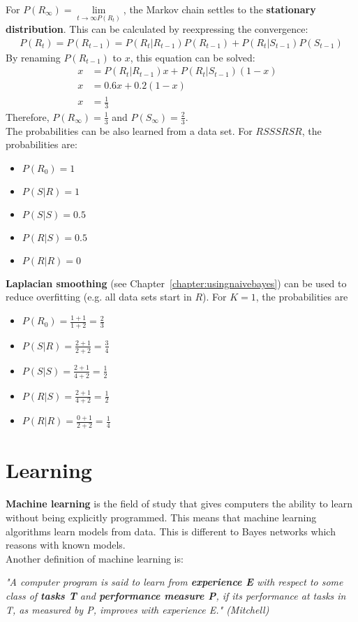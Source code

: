 \documentclass{report}
\begin{document}
For $P(R_\infty)=\lim\limits_{t \rightarrow \infty P(R_t)}$, the Markov chain settles to the {\bf stationary distribution}. This can be calculated by reexpressing the convergence:
\begin{align*}
P(R_t) = P(R_{t-1}) = P(R_t\vert R_{t-1})P(R_{t-1}) + P(R_t\vert S_{t-1})P(S_{t-1})
\end{align*}
By renaming $P(R_{t-1})$ to $x$, this equation can be solved:
\begin{align*}
x &= P(R_t\vert R_{t-1})x + P(R_t\vert S_{t-1})(1-x) &\\
x &= 0.6x + 0.2(1-x) \\
x &= \frac{1}{3}
\end{align*}
Therefore, $P(R_\infty)=\frac{1}{3}$ and $P(S_\infty)=\frac{2}{3}$. \\
The probabilities can be also learned from a data set. For $RSSSRSR$, the probabilities are:
\begin{itemize}
\item $P(R_0)=1$
\item $P(S\vert R)=1$
\item $P(S\vert S)=0.5$
\item $P(R\vert S)=0.5$
\item $P(R\vert R)=0$
\end{itemize}
{\bf Laplacian smoothing} (see Chapter~\ref{chapter:usingnaivebayes}) can be used to reduce overfitting (e.g. all data sets start in $R$). For $K=1$, the probabilities are
\begin{itemize}
\item $P(R_0)=\frac{1+1}{1+2}=\frac{2}{3}$
\item $P(S\vert R)=\frac{2+1}{2+2}=\frac{3}{4}$
\item $P(S\vert S)=\frac{2+1}{4+2}=\frac{1}{2}$
\item $P(R\vert S)=\frac{2+1}{4+2}=\frac{1}{2}$
\item $P(R\vert R)=\frac{0+1}{2+2}=\frac{1}{4}$
\end{itemize}


\chapter{Learning}

{\bf Machine learning} is the field of study that gives computers the ability to learn without being explicitly programmed.
This means that machine learning algorithms learn models from data.
This is different to Bayes networks which reasons with known models.
\\
Another definition of machine learning is:
\begin{flushright}
{\em "A computer program is said to learn from {\bf experience E} with respect to some class of {\bf tasks T} and {\bf performance measure P}, if its performance at tasks in T, as measured by P, improves with experience E." (Mitchell)}
\end{flushright}
\end{document}
